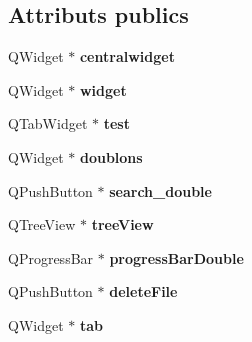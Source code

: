 \subsection*{Attributs publics}
\begin{DoxyCompactItemize}
\item 
\hypertarget{class_ui___org_view_a60c22c7cae0804f412bffda4eb37fe89}{Q\-Widget $\ast$ {\bfseries centralwidget}}\label{class_ui___org_view_a60c22c7cae0804f412bffda4eb37fe89}

\item 
\hypertarget{class_ui___org_view_a500ed1d489b4d1dfebc6a81b0c61e5af}{Q\-Widget $\ast$ {\bfseries widget}}\label{class_ui___org_view_a500ed1d489b4d1dfebc6a81b0c61e5af}

\item 
\hypertarget{class_ui___org_view_adbd58e532fd4db9afd2b1d9c08a95319}{Q\-Tab\-Widget $\ast$ {\bfseries test}}\label{class_ui___org_view_adbd58e532fd4db9afd2b1d9c08a95319}

\item 
\hypertarget{class_ui___org_view_a9bc9e46ec3a4274d2b2b9447a2340ebd}{Q\-Widget $\ast$ {\bfseries doublons}}\label{class_ui___org_view_a9bc9e46ec3a4274d2b2b9447a2340ebd}

\item 
\hypertarget{class_ui___org_view_a225f3433070d7e4c89f16992bda97613}{Q\-Push\-Button $\ast$ {\bfseries search\-\_\-double}}\label{class_ui___org_view_a225f3433070d7e4c89f16992bda97613}

\item 
\hypertarget{class_ui___org_view_a8fe6ded92ad2b37a338f98d09526083a}{Q\-Tree\-View $\ast$ {\bfseries tree\-View}}\label{class_ui___org_view_a8fe6ded92ad2b37a338f98d09526083a}

\item 
\hypertarget{class_ui___org_view_a7e438ecee8e00a03b1d7d5c195177c54}{Q\-Progress\-Bar $\ast$ {\bfseries progress\-Bar\-Double}}\label{class_ui___org_view_a7e438ecee8e00a03b1d7d5c195177c54}

\item 
\hypertarget{class_ui___org_view_a63c176c0aff655c9931f59557f3ea3e1}{Q\-Push\-Button $\ast$ {\bfseries delete\-File}}\label{class_ui___org_view_a63c176c0aff655c9931f59557f3ea3e1}

\item 
\hypertarget{class_ui___org_view_a580c7f71489da0743643d8fe14c77960}{Q\-Widget $\ast$ {\bfseries tab}}\label{class_ui___org_view_a580c7f71489da0743643d8fe14c77960}


\end{DoxyCompactItemize}
